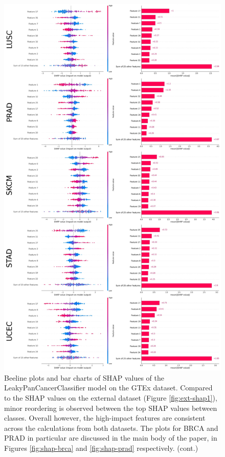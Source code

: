 \documentclass{l4proj}
\begin{document}
\begin{appendices}
\begin{figure}\ContinuedFloat
    \centering
    \includegraphics[width=0.85\linewidth]{images/gtex_shap2.jpg}
    \caption{Beeline plots and bar charts of SHAP values of the LeakyPanCancerClassifier model on the GTEx dataset. Compared to the SHAP values on the external dataset (Figure \ref{fig:ext-shap1}), minor reordering is observed between the top SHAP values between classes. Overall however, the high-impact features are consistent across the calculations from both datasets. The plots for BRCA and PRAD in particular are discussed in the main body of the paper, in Figures \ref{fig:shap-brca} and \ref{fig:shap-prad} respectively. (cont.)}
    \label{fig:gtex-shap2}
\end{figure}


\end{appendices}
\end{document}
